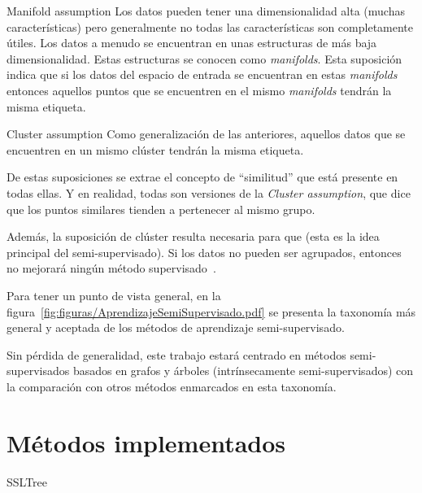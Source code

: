 \medskip

\begin{mainbox}{Manifold assumption}
    Los datos pueden tener una dimensionalidad alta (muchas características)
    pero generalmente no todas las características son completamente útiles. Los
    datos a menudo se encuentran en unas estructuras de más baja
    dimensionalidad. Estas estructuras se conocen como \emph{manifolds}.
    Esta suposición indica que si los datos del espacio de entrada se encuentran
    en estas \emph{manifolds} entonces aquellos puntos que se encuentren en
    el mismo \emph{manifolds} tendrán la misma etiqueta.
   ~\cite{towardsdatascience:semi,vanEngelen2020}
\end{mainbox}

\medskip

\begin{mainbox}{Cluster assumption}
    Como generalización de las anteriores, aquellos datos que se encuentren en
    un mismo clúster tendrán la misma etiqueta.
\end{mainbox}


De estas suposiciones se extrae el concepto de ``similitud'' que está presente
en todas ellas. Y en realidad, todas son versiones de la \textit{Cluster
assumption}, que dice que los puntos similares tienden a pertenecer al mismo
grupo. 

Además, la suposición de clúster resulta necesaria para que  (esta es la idea principal del semi-supervisado). Si los datos no pueden ser agrupados,
entonces no mejorará ningún método supervisado~\cite{vanEngelen2020}.


Para tener un punto de vista general, en la figura~\ref{fig:figuras/AprendizajeSemiSupervisado.pdf} se presenta la
taxonomía más general y aceptada de los métodos de aprendizaje semi-supervisado.


Sin pérdida de generalidad, este trabajo estará centrado en métodos semi-supervisados basados en grafos y árboles (intrínsecamente semi-supervisados) con la comparación con otros métodos enmarcados en esta taxonomía.

\clearpage
\section{Métodos implementados}

SSLTree